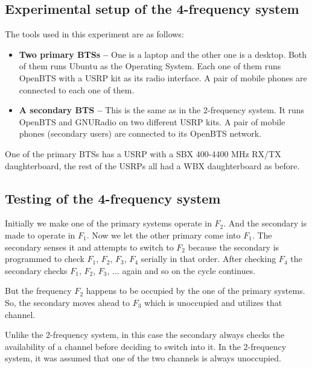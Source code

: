 \subsection{Experimental setup of the 4-frequency system}
The tools used in this experiment are as follows:
\begin{itemize}
    \item \textbf{Two primary BTSs --} One is a laptop and the other one is a
    desktop. Both of them runs Ubuntu as the Operating System. Each one of
    them runs OpenBTS with a USRP kit as its radio interface. A pair of mobile
    phones are connected to each one of them.
    \item \textbf{A secondary BTS --} This is the same as in the 
    2-frequency system. It runs OpenBTS and GNURadio on two different USRP
    kits. A pair of mobile phones (secondary users) are connected to its
    OpenBTS network.
\end{itemize}

One of the primary BTSs has a USRP with a SBX 400-4400 MHz RX/TX 
daughterboard, the rest of the USRPs all had a WBX daughterboard as before.

\subsection{Testing of the 4-frequency system}

Initially we make one of the primary systems operate in $F_2$. And the 
secondary is made to operate in $F_1$. Now we let the other primary come into 
$F_1$. The secondary senses it and attempts to switch to $F_2$ because the 
secondary is programmed to check $F_1$, $F_2$, $F_3$, $F_4$ serially in that 
order. After checking $F_4$ the secondary checks $F_1$, $F_2$, $F_3$, ... 
again and so on the cycle continues.

But the frequency $F_2$ happens to be occupied by the one of the primary 
systems. So, the secondary moves ahead to $F_3$ which is unoccupied and 
utilizes that channel.

Unlike the 2-frequency system, in this case the secondary always checks 
the availability of a channel before deciding to switch into it. In the 
2-frequency system, it was assumed that one of the two channels is always
unoccupied.

